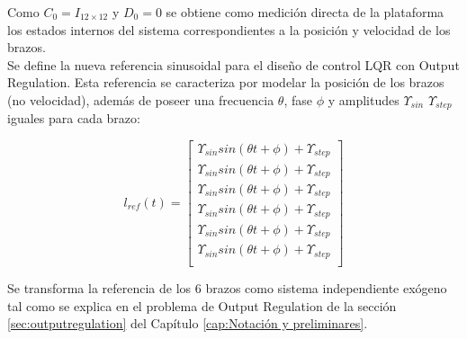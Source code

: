 Como $C_0 = I_{12\times12}$ y $D_0 = 0$ se obtiene como medición directa de la plataforma los estados internos del sistema correspondientes a la posición y velocidad de los brazos. \\

Se define la nueva referencia sinusoidal para el diseño de control LQR con Output Regulation. Esta referencia se caracteriza por modelar la posición de los brazos (no velocidad), además de poseer una frecuencia $\theta$, fase $\phi$ y amplitudes $\Upsilon_{sin}$ $\Upsilon_{step}$ iguales para cada brazo:

\begin{equation}
    l_{ref}(t) = \begin{bmatrix}
        \Upsilon_{sin} sin(\theta t + \phi) + \Upsilon_{step}\\
        \Upsilon_{sin} sin(\theta t + \phi) + \Upsilon_{step}\\
        \Upsilon_{sin} sin(\theta t + \phi) + \Upsilon_{step}\\
        \Upsilon_{sin} sin(\theta t + \phi) + \Upsilon_{step}\\
        \Upsilon_{sin} sin(\theta t + \phi) + \Upsilon_{step}\\
        \Upsilon_{sin} sin(\theta t + \phi) + \Upsilon_{step}\\
    \end{bmatrix}
\end{equation}

Se transforma la referencia de los 6 brazos como sistema independiente exógeno tal como se explica en el problema de Output Regulation de la sección \ref{sec:outputregulation} del Capítulo \ref{cap:Notación y preliminares}. 

